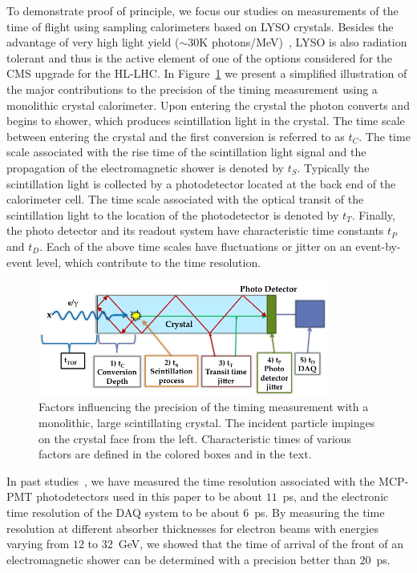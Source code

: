 \documentclass[12pt]{article}
\begin{document}
To demonstrate proof of principle, we focus our studies on
measurements of the time of flight using sampling calorimeters
based on LYSO crystals. Besides the advantage of very high light
yield ($\sim 30$K photons/MeV)~\cite{LYSOProperties}, LYSO is also radiation tolerant and
thus is the active element of one of the options considered 
for the CMS upgrade for the HL-LHC. In Figure~\ref{fig:ScintillatorTiming} 
we present a simplified illustration of the major contributions to the 
precision of the timing measurement using a monolithic crystal calorimeter.
Upon entering the crystal the photon converts and begins to shower,
which produces scintillation light in the crystal. The time scale
between entering the crystal and the first conversion is referred to
as $t_C$. The time scale associated with the rise time of the scintillation 
light signal and the propagation of the electromagnetic shower is denoted
by $t_S$. Typically the scintillation light is collected by a photodetector
located at the back end of the calorimeter cell. The time scale associated
with the optical transit of the scintillation light to the location of the
photodetector is denoted by $t_T$. Finally, the photo detector and
its readout system have characteristic time constants $t_P$ and $t_D$.
Each of the above time scales have fluctuations or jitter on an event-by-event
level, which contribute to the time resolution.

\begin{figure}[h] \centering
\includegraphics[width=0.85\textwidth]{figs/ScintillatorTiming} \caption{Factors
influencing the precision of the timing measurement with a monolithic, large
scintillating crystal. The incident particle impinges on the crystal face from
the left. Characteristic times of various factors are defined in the colored
boxes and in the text.}
\label{fig:ScintillatorTiming}
\end{figure}

In past studies~\cite{MCPFastCaloNIMA}, we have measured the time resolution
associated with the MCP-PMT photodetectors used in this paper to be
about $11$~ps, and the electronic time resolution
of the DAQ system to be about $6$~ps. By measuring the time
resolution at different absorber thicknesses for electron beams with
energies varying from $12$ to $32$~GeV, we showed that the 
time of arrival of the front of an electromagnetic shower
can be determined with a precision better than $20$~ps.
\end{document}

